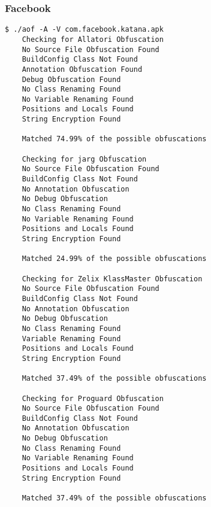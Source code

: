 \subsubsection{Facebook \cite{facebook}}
\label{app:aface}
\begin{lstlisting}
$ ./aof -A -V com.facebook.katana.apk
    Checking for Allatori Obfuscation
	No Source File Obfuscation Found
	BuildConfig Class Not Found
	Annotation Obfuscation Found
	Debug Obfuscation Found
	No Class Renaming Found
	No Variable Renaming Found
	Positions and Locals Found
	String Encryption Found

	Matched 74.99% of the possible obfuscations

    Checking for jarg Obfuscation
	No Source File Obfuscation Found
	BuildConfig Class Not Found
	No Annotation Obfuscation
	No Debug Obfuscation
	No Class Renaming Found
	No Variable Renaming Found
	Positions and Locals Found
	String Encryption Found

	Matched 24.99% of the possible obfuscations

    Checking for Zelix KlassMaster Obfuscation
	No Source File Obfuscation Found
	BuildConfig Class Not Found
	No Annotation Obfuscation
	No Debug Obfuscation
	No Class Renaming Found
	Variable Renaming Found
	Positions and Locals Found
	String Encryption Found

	Matched 37.49% of the possible obfuscations

    Checking for Proguard Obfuscation
	No Source File Obfuscation Found
	BuildConfig Class Not Found
	No Annotation Obfuscation
	No Debug Obfuscation
	No Class Renaming Found
	No Variable Renaming Found
	Positions and Locals Found
	String Encryption Found

	Matched 37.49% of the possible obfuscations
\end{lstlisting}
\newpage
